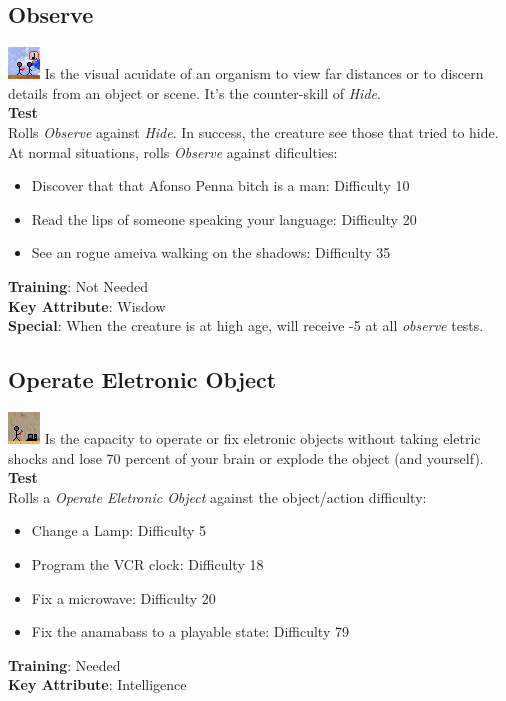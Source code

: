 \documentclass[ letterpaper,12pt]{article}
\begin{document}
\subsection{Observe}
\includegraphics{../data/skills/Img/observar.png}
Is the visual acuidate of an organism to view far  distances or to discern details from an object or scene. It's the counter-skill of {\it Hide}.\\
{\bf Test}\\
Rolls {\it Observe} against {\it Hide}. In success, the creature see those that tried to hide.  At normal situations, rolls {\it Observe} against dificulties:\\
\begin{itemize}
\item{Discover that that Afonso Penna bitch is a man: Difficulty 10}
\item{Read the lips of someone speaking your language:  Difficulty 20}
\item{See an rogue ameiva walking on the shadows: Difficulty 35}
\end{itemize}
{\bf Training}: Not Needed\\
{\bf Key Attribute}: Wisdow\\
{\bf Special}: When the creature is at high age, will receive -5 at all {\it observe} tests.\\

\subsection{Operate Eletronic Object}
\includegraphics{../data/skills/Img/opobjele.png}
Is the capacity to operate or fix eletronic objects without taking eletric shocks and lose 70 percent of your brain or explode the object (and yourself).\\
{\bf Test}\\
Rolls a {\it Operate Eletronic Object} against the object/action difficulty:
\begin{itemize}
\item{Change a Lamp: Difficulty 5}
\item{Program the VCR clock: Difficulty 18}
\item{Fix a microwave: Difficulty 20}
\item{Fix the anamabass to a playable state: Difficulty 79}
\end{itemize}
{\bf Training}: Needed\\
{\bf Key Attribute}: Intelligence\\
\end{document}
